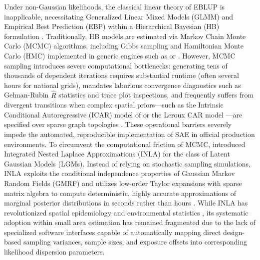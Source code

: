 Under non-Gaussian likelihoods, the classical linear theory of EBLUP is inapplicable, necessitating Generalized Linear Mixed Models (GLMM) and Empirical Best Prediction (EBP) within a Hierarchical Bayesian (HB) formulation \citep{rao2015small}. Traditionally, HB models are estimated via Markov Chain Monte Carlo (MCMC) algorithms, including Gibbs sampling and Hamiltonian Monte Carlo (HMC) implemented in generic engines such as  or  \citep{gelman2013bayesian}. However, MCMC sampling introduces severe computational bottlenecks: generating tens of thousands of dependent iterations requires substantial runtime (often several hours for national grids), mandates laborious convergence diagnostics such as Gelman-Rubin $\hat{R}$ statistics and trace plot inspections, and frequently suffers from divergent transitions when complex spatial priors---such as the Intrinsic Conditional Autoregressive (ICAR) model of \citet{besag1991bayesian} or the Leroux CAR model \citep{leroux2000estimation}---are specified over sparse graph topologies \citep{simpson2017penalising}. These operational barriers severely impede the automated, reproducible implementation of SAE in official production environments. To circumvent the computational friction of MCMC, \citet{rue2009approximate} introduced Integrated Nested Laplace Approximations (INLA) for the class of Latent Gaussian Models (LGMs). Instead of relying on stochastic sampling simulations, INLA exploits the conditional independence properties of Gaussian Markov Random Fields (GMRF) and utilizes low-order Taylor expansions with sparse matrix algebra to compute deterministic, highly accurate approximations of marginal posterior distributions in seconds rather than hours \citep{rue2017bayesian, gomez2020bayesian}. While INLA has revolutionized spatial epidemiology and environmental statistics \citep{bivand2015spatial}, its systematic adoption within small area estimation has remained fragmented due to the lack of specialized software interfaces capable of automatically mapping direct design-based sampling variances, sample sizes, and exposure offsets into corresponding likelihood dispersion parameters.

